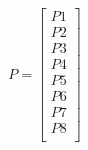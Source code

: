 \begin{table}
\begin{equation}
P=\begin{bmatrix}
P1\\
P2\\
P3\\
P4\\
P5\\
P6\\
P7\\
P8\\
\end{bmatrix}
\label{matrix}
\end{equation}
\end{table}

